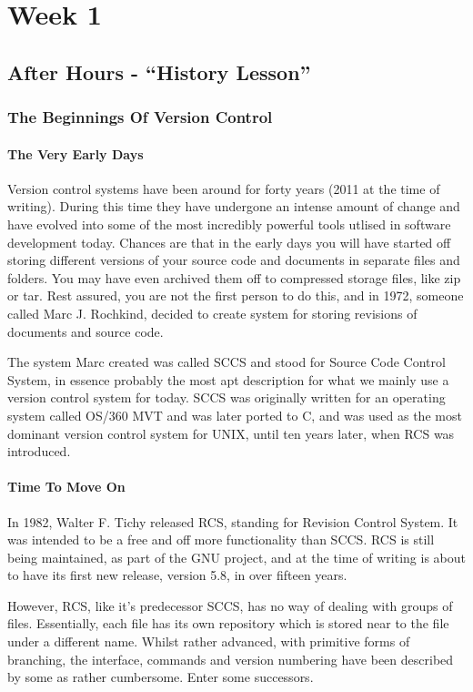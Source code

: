 \chapter{Week 1}
\section{After Hours - ``History Lesson''}
\subsection{The Beginnings Of Version Control}

\subsubsection{The Very Early Days}
Version control systems have been around for forty years (2011 at the time of writing).  During this time they have undergone an intense amount of change and have evolved into some of the most incredibly powerful tools utlised in software development today.  Chances are that in the early days you will have started off storing different versions of your source code and documents in separate files and folders.  You may have even archived them off to compressed storage files, like zip or tar.  Rest assured, you are not the first person to do this, and in 1972, someone called Marc J. Rochkind, decided to create system for storing revisions of documents and source code.

The system Marc created was called SCCS and stood for Source Code Control System, in essence probably the most apt description for what we mainly use a version control system for today.  SCCS was originally written for an operating system called OS/360 MVT and was later ported to C, and was used as the most dominant version control system for UNIX, until ten years later, when RCS was introduced.

\subsubsection{Time To Move On}
In 1982, Walter F. Tichy released RCS, standing for Revision Control System.  It was intended to be a free and off more functionality than SCCS.  RCS is still being maintained, as part of the GNU project, and at the time of writing is about to have its first new release, version 5.8, in over fifteen years.

However, RCS, like it's predecessor SCCS, has no way of dealing with groups of files.  Essentially, each file has its own repository which is stored near to the file under a different name.  Whilst rather advanced, with primitive forms of branching, the interface, commands and version numbering have been described by some as rather cumbersome.  Enter some successors.

